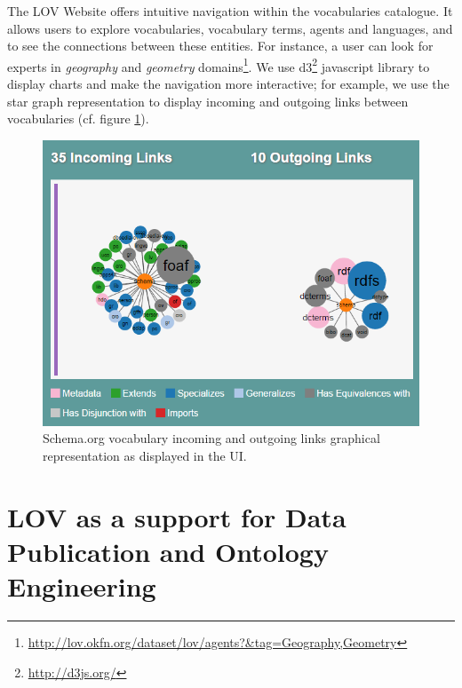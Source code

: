 \documentclass{iosart2c}
\begin{document}
The LOV Website offers intuitive navigation within the vocabularies catalogue. It allows users to explore vocabularies, vocabulary terms, agents and languages, and to see the connections between these entities. For instance, a user can look for experts in \emph{geography} and \emph{geometry} domains\footnote{\url{http://lov.okfn.org/dataset/lov/agents?&tag=Geography,Geometry}}. We use d3\footnote{\url{http://d3js.org/}} javascript library to display charts and make the navigation more interactive; for example, we use the star graph representation to display incoming and outgoing links between vocabularies (cf. figure \ref{fig:graphVocab}). 


\begin{figure}[ht!b]
\includegraphics[scale=0.45]{graphVocab.png}
\caption{Schema.org vocabulary incoming and outgoing links graphical representation as displayed in the UI.}
\label{fig:graphVocab}
\end{figure}




\section{LOV as a support for Data Publication and Ontology Engineering}
\label{sec:dataPubOntoEngine}
\end{document}
